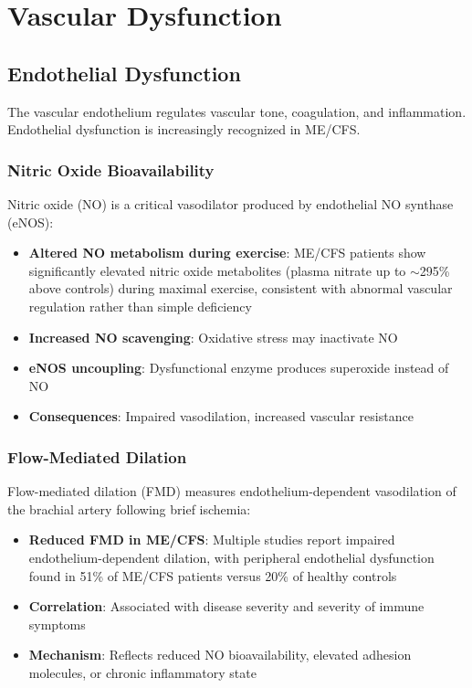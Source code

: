 \section{Vascular Dysfunction}
\label{sec:vascular}

\subsection{Endothelial Dysfunction}
\label{sec:endothelial}

The vascular endothelium regulates vascular tone, coagulation, and inflammation. Endothelial dysfunction is increasingly recognized in ME/CFS.

\subsubsection{Nitric Oxide Bioavailability}

Nitric oxide (NO) is a critical vasodilator produced by endothelial NO synthase (eNOS):

\begin{itemize}
    \item \textbf{Altered NO metabolism during exercise}: ME/CFS patients show significantly elevated nitric oxide metabolites (plasma nitrate up to $\sim$295\% above controls) during maximal exercise, consistent with abnormal vascular regulation rather than simple deficiency~\cite{Suarez2010nitricoxide}
    \item \textbf{Increased NO scavenging}: Oxidative stress may inactivate NO
    \item \textbf{eNOS uncoupling}: Dysfunctional enzyme produces superoxide instead of NO
    \item \textbf{Consequences}: Impaired vasodilation, increased vascular resistance
\end{itemize}

\subsubsection{Flow-Mediated Dilation}

Flow-mediated dilation (FMD) measures endothelium-dependent vasodilation of the brachial artery following brief ischemia:

\begin{itemize}
    \item \textbf{Reduced FMD in ME/CFS}: Multiple studies report impaired endothelium-dependent dilation, with peripheral endothelial dysfunction found in 51\% of ME/CFS patients versus 20\% of healthy controls~\cite{Scherbakov2020}
    \item \textbf{Correlation}: Associated with disease severity and severity of immune symptoms~\cite{Scherbakov2020}
    \item \textbf{Mechanism}: Reflects reduced NO bioavailability, elevated adhesion molecules, or chronic inflammatory state~\cite{Appel2025}
\end{itemize}

